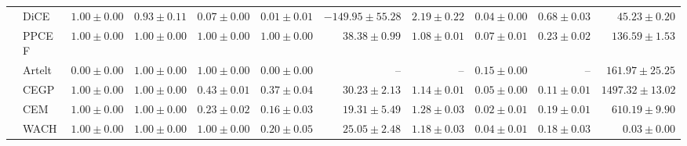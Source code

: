 \begin{table}[ht]
\begin{center}
\begin{sc}
\begin{scriptsize}
\begin{tabular}{l|l|rrrrrrrrr}
 & DiCE & $\boldsymbol{1.00\pm{0.00}}$ & $0.93\pm{0.11}$ & $0.07\pm{0.00}$ & $0.01\pm{0.01}$ & $-149.95\pm{55.28}$ & $2.19\pm{0.22}$ & $0.04\pm{0.00}$ & $0.68\pm{0.03}$ & $45.23\pm{0.20}$ \\
 & PPCEF & $\boldsymbol{1.00\pm{0.00}}$ & $\boldsymbol{1.00\pm{0.00}}$ & $\boldsymbol{1.00\pm{0.00}}$ & $\boldsymbol{1.00\pm{0.00}}$ & $38.38\pm{0.99}$ & $1.08\pm{0.01}$ & $0.07\pm{0.01}$ & $0.23\pm{0.02}$ & $136.59\pm{1.53}$ \\
 & Artelt & $0.00\pm{0.00}$ & $\boldsymbol{1.00\pm{0.00}}$ & $\boldsymbol{1.00\pm{0.00}}$ & $0.00\pm{0.00}$ & -- & -- & $\boldsymbol{0.15\pm{0.00}}$ & -- & $161.97\pm{25.25}$ \\
 & CEGP & $\boldsymbol{1.00\pm{0.00}}$ & $\boldsymbol{1.00\pm{0.00}}$ & $0.43\pm{0.01}$ & $0.37\pm{0.04}$ & $30.23\pm{2.13}$ & $1.14\pm{0.01}$ & $0.05\pm{0.00}$ & $\boldsymbol{0.11\pm{0.01}}$ & $1497.32\pm{13.02}$ \\
 & CEM & $\boldsymbol{1.00\pm{0.00}}$ & $\boldsymbol{1.00\pm{0.00}}$ & $0.23\pm{0.02}$ & $0.16\pm{0.03}$ & $19.31\pm{5.49}$ & $1.28\pm{0.03}$ & $0.02\pm{0.01}$ & $0.19\pm{0.01}$ & $610.19\pm{9.90}$ \\
 & WACH & $\boldsymbol{1.00\pm{0.00}}$ & $\boldsymbol{1.00\pm{0.00}}$ & $\boldsymbol{1.00\pm{0.00}}$ & $0.20\pm{0.05}$ & $25.05\pm{2.48}$ & $1.18\pm{0.03}$ & $0.04\pm{0.01}$ & $0.18\pm{0.03}$ & $\boldsymbol{0.03\pm{0.00}}$ \\
\bottomrule
\end{tabular}
\end{scriptsize}
\end{sc}
\end{center}
\end{table}
